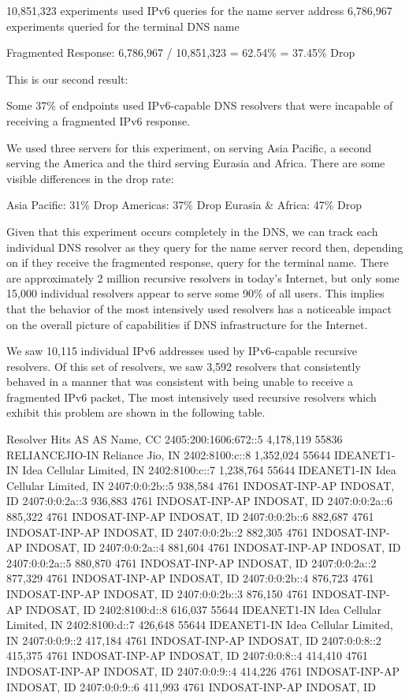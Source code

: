 10,851,323 experiments used IPv6 queries for the name server address
 6,786,967 experiments queried for the terminal DNS name

Fragmented Response: 6,786,967 / 10,851,323 = 62.54\% = 37.45\% Drop

This is our second result:

Some 37\% of endpoints used IPv6-capable DNS resolvers that were incapable of receiving a fragmented IPv6 response.

We used three servers for this experiment, on serving Asia Pacific, a second serving the America and the third serving Eurasia and Africa. There are some visible differences in the drop rate:

Asia Pacific: 31\% Drop
Americas: 37\% Drop
Eurasia & Africa: 47\% Drop

Given that this experiment occurs completely in the DNS, we can track each individual DNS resolver as they query for the name server record then, depending on if they receive the fragmented response, query for the terminal name. There are approximately 2 million recursive resolvers in today’s Internet, but only some 15,000 individual resolvers appear to serve some 90\% of all users. This implies that the behavior of the most intensively used resolvers has a noticeable impact on the overall picture of capabilities if DNS infrastructure for the Internet.

We saw 10,115 individual IPv6 addresses used by IPv6-capable recursive resolvers. Of this set of resolvers, we saw 3,592 resolvers that consistently behaved in a manner that was consistent with being unable to receive a fragmented IPv6 packet, The most intensively used recursive resolvers which exhibit this problem are shown in the following table.

Resolver Hits  AS AS Name, CC
2405:200:1606:672::5    4,178,119      55836 RELIANCEJIO-IN Reliance Jio, IN
2402:8100:c::8 1,352,024   55644 IDEANET1-IN Idea Cellular Limited, IN
2402:8100:c::7 1,238,764   55644 IDEANET1-IN Idea Cellular Limited, IN
2407:0:0:2b::5 938,584  4761  INDOSAT-INP-AP INDOSAT, ID
2407:0:0:2a::3 936,883  4761  INDOSAT-INP-AP INDOSAT, ID
2407:0:0:2a::6 885,322  4761  INDOSAT-INP-AP INDOSAT, ID
2407:0:0:2b::6 882,687  4761  INDOSAT-INP-AP INDOSAT, ID
2407:0:0:2b::2 882,305  4761  INDOSAT-INP-AP INDOSAT, ID
2407:0:0:2a::4 881,604  4761  INDOSAT-INP-AP INDOSAT, ID
2407:0:0:2a::5 880,870  4761  INDOSAT-INP-AP INDOSAT, ID
2407:0:0:2a::2 877,329  4761  INDOSAT-INP-AP INDOSAT, ID
2407:0:0:2b::4 876,723  4761  INDOSAT-INP-AP INDOSAT, ID
2407:0:0:2b::3 876,150  4761  INDOSAT-INP-AP INDOSAT, ID
2402:8100:d::8 616,037  55644 IDEANET1-IN Idea Cellular Limited, IN
2402:8100:d::7 426,648  55644 IDEANET1-IN Idea Cellular Limited, IN
2407:0:0:9::2  417,184  4761  INDOSAT-INP-AP INDOSAT, ID
2407:0:0:8::2  415,375  4761  INDOSAT-INP-AP INDOSAT, ID
2407:0:0:8::4  414,410  4761  INDOSAT-INP-AP INDOSAT, ID
2407:0:0:9::4  414,226  4761  INDOSAT-INP-AP INDOSAT, ID
2407:0:0:9::6  411,993  4761  INDOSAT-INP-AP INDOSAT, ID

